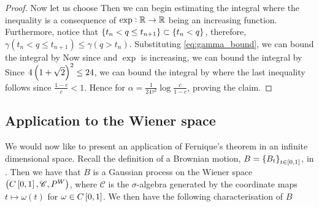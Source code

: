 \documentclass[../main.tex]{subfiles}
\begin{document}
\begin{proof}
Now let us choose  Then we can begin estimating the integral  where the inequality is a consequence of $\exp:\operatorname{\mathbb{R}}\to\operatorname{\mathbb{R}}$ being an increasing function. Furthermore, notice that $\cbr{t_n<q\leq t_{n+1}}\subset\cbr{t_n<q}$, therefore, $\gamma(t_n<q\leq t_{n+1})\leq\gamma(q>t_n)$. Substituting \eqref{eq:gamma_bound}, we can bound the integral by   Now since  and $\exp$ is increasing, we can bound the integral by  Since $4\del{1 + \sqrt{2}}^2\leq 24$, we can bound the integral by  where the last inequality follows since $\frac{1-c}{c}<1$. Hence  for $\alpha = \frac{1}{24\tau^2}\log\frac{c}{1-c}$, proving the claim.
\end{proof}
\subsection{Application to the Wiener space}
We would now like to present an application of Fernique's theorem in an infinite dimensional space. Recall the definition of a Brownian motion, $B = \cbr{B_t}_{t\in\intcc{0,1}}$, in . Then we have that $B$ is a Gaussian process on the Wiener space $\del{C\intcc{0,1},\mathscr{C},P^W}$, where $\mathscr{C}$ is the $\sigma$-algebra generated by the coordinate maps $t\mapsto\omega(t)$ for $\omega\in C\intcc{0,1}$. We then have the following characterisation of $B$ 
\end{document}
